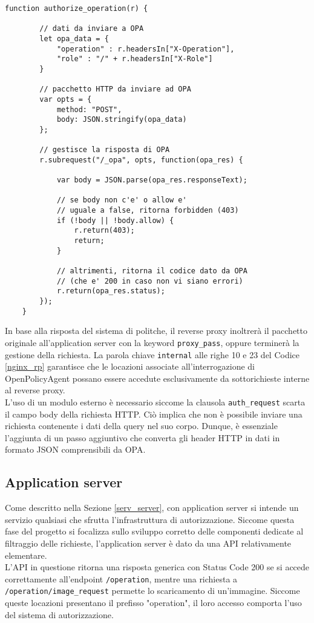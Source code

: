 \begin{lstlisting}[caption={Frammento di codice del modulo NJS},captionpos=b,label=NJS]
    function authorize_operation(r) {

        // dati da inviare a OPA
        let opa_data = {
            "operation" : r.headersIn["X-Operation"],
            "role" : "/" + r.headersIn["X-Role"]
        }
    
        // pacchetto HTTP da inviare ad OPA
        var opts = {
            method: "POST",
            body: JSON.stringify(opa_data)
        };
        
        // gestisce la risposta di OPA
        r.subrequest("/_opa", opts, function(opa_res) {
    
            var body = JSON.parse(opa_res.responseText);
            
            // se body non c'e' o allow e' 
            // uguale a false, ritorna forbidden (403)
            if (!body || !body.allow) {
                r.return(403);
                return;
            }

            // altrimenti, ritorna il codice dato da OPA 
            // (che e' 200 in caso non vi siano errori)
            r.return(opa_res.status);
        });
    }
\end{lstlisting}
In base alla risposta del sistema di politche, il reverse proxy inoltrerà il pacchetto originale all'application server con la keyword \texttt{proxy\_pass}, 
oppure terminerà la gestione della richiesta.
La parola chiave \texttt{internal} alle righe 10 e 23 del Codice \ref{nginx_rp}  garantisce che le locazioni 
associate all'interrogazione di OpenPolicyAgent possano essere accedute esclusivamente da sottorichieste interne al reverse proxy. 
\\ L'uso di un modulo esterno è necessario siccome la clausola \texttt{auth\_request} scarta il campo body della 
richiesta HTTP. Ciò implica che non è possibile inviare una richiesta contenente i dati della query nel suo corpo.
Dunque, è essenziale l'aggiunta di un passo aggiuntivo che converta gli header HTTP in dati in formato
JSON comprensibili da OPA. 


\subsection{Application server}
Come descritto nella Sezione \ref*{serv_server}, con application server si intende un servizio qualsiasi che sfrutta 
l'infrastruttura di autorizzazione. 
Siccome questa fase del progetto si focalizza sullo sviluppo corretto delle componenti dedicate 
al filtraggio delle richieste, l'application server è dato da una API relativamente elementare. \\
L'API in questione ritorna una risposta generica con Status Code 200 se si accede correttamente all'endpoint \texttt{/operation}, 
mentre una richiesta a \texttt{/operation/image\_request} permette lo scaricamento di 
un'immagine. Siccome queste locazioni presentano il prefisso "operation", il loro accesso comporta l'uso 
del sistema di autorizzazione.  

